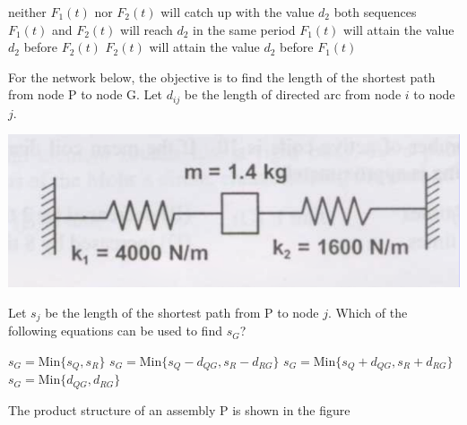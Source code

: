 \documentclass[addpoints,11pt]{exam}
\begin{document}
\begin{questions}
    \begin{choices}
        \choice neither $F_1(t)$ nor $F_2(t)$ will catch up with the value $d_2$
        \choice both sequences $F_1(t)$ and $F_2(t)$ will reach $d_2$ in the same period
        \choice $F_1(t)$ will attain the value $d_2$ before $F_2(t)$
        \choice $F_2(t)$ will attain the value $d_2$ before $F_1(t)$
    \end{choices}

    \question For the network below, the objective is to find the length of the shortest path from node P to node G. Let $d_{ij}$ be the length of directed arc from node $i$ to node $j$.

    \begin{center}
        \includegraphics[scale=0.3]{q35}
    \end{center}
    Let $s_j$ be the length of the shortest path from P to node $j$. Which of the following equations can be used to find $s_G$?

    \begin{choices}
        \choice $s_G = \text{Min}\{s_Q,s_R\}$
        \choice $s_G = \text{Min}\{s_Q-d_{QG},s_R-d_{RG}\}$
        \choice $s_G = \text{Min}\{s_Q+d_{QG},s_R+d_{RG}\}$
        \choice $s_G = \text{Min}\{d_{QG},d_{RG}\}$
    \end{choices}

    \question The product structure of an assembly P is shown in the figure
    

\end{questions}
\end{document}
